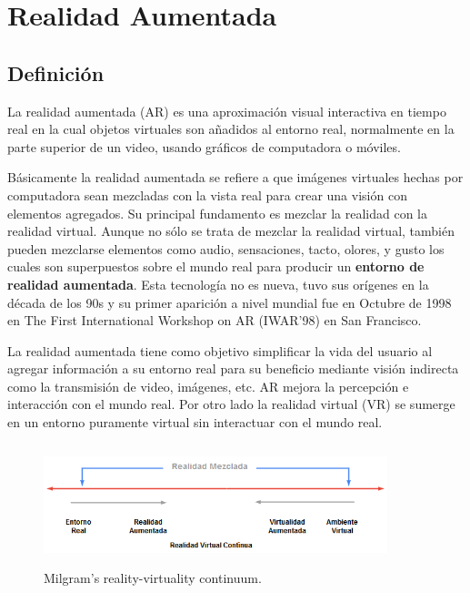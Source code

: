 \newpage
\section{Realidad Aumentada}
\setcounter{secnumdepth}{2}

\subsection{Definición}
La realidad aumentada (AR) es una aproximación visual interactiva en tiempo real en la cual objetos virtuales son añadidos al entorno real, normalmente en la parte superior de un video, usando gráficos de computadora o móviles\cite{B04}. \par
\vspace{5mm}
Básicamente la realidad aumentada se refiere a que imágenes virtuales hechas por computadora sean mezcladas con la vista real para crear una visión con elementos agregados. Su principal fundamento es mezclar la realidad con la realidad virtual. Aunque no sólo se trata de mezclar la realidad virtual, también pueden mezclarse elementos como audio, sensaciones, tacto, olores, y gusto los cuales son superpuestos sobre el mundo real para producir un \textbf{entorno de realidad aumentada}\cite{B05}.
Esta tecnología no es nueva, tuvo sus orígenes en la década de los 90s\cite{B04} y su primer aparición a nivel mundial fue en Octubre de 1998 en The First International Workshop on AR (IWAR'98) en San Francisco\cite{B05}.\par 
\vspace{5mm}
La realidad aumentada tiene como objetivo simplificar la vida del usuario al agregar información a su entorno real para su beneficio mediante visión indirecta como la transmisión de video, imágenes, etc. AR mejora la percepción e interacción con el mundo real. Por otro lado la realidad virtual (VR) se sumerge en un entorno puramente virtual sin interactuar con el mundo real\cite{B27}.\par
\begin{figure}[h!]
	\centering
	\includegraphics[width=10cm,height=3.5cm]{imagenes/marcoteorico/ar/Mixed_Reallity.png}
	\caption{Milgram’s reality-virtuality continuum.\cite{B27}}
	\label{fig:analogo}
\end{figure}
